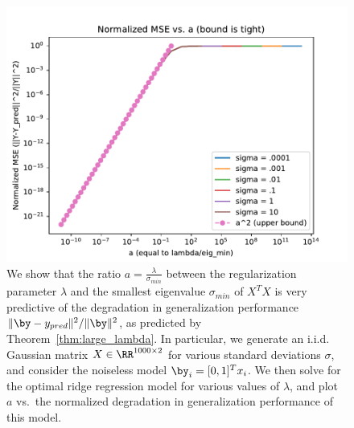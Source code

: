 \begin{figure}
	\begin{center}
		\centerline{\includegraphics[width=0.8\columnwidth]{figures/micro_large_sigma_min.pdf}}
		\caption{We show that the ratio $a=\frac{\lambda}{\sigma_{min}}$ between the regularization parameter $\lambda$ and the smallest eigenvalue $\sigma_{min}$ of $X^T X$ is very predictive of the degradation in generalization performance $\|\by - y_{pred}\|^2/\|\by\|^2$, as predicted by Theorem~\ref{thm:large_lambda}.
		In particular, we generate an i.i.d. Gaussian matrix $X\in \RR^{1000\times 2}$ for various standard deviations $\sigma$, and consider the noiseless model $\by_i = [0,1]^T x_i$.
		We then solve for the optimal ridge regression model for various values of $\lambda$, and plot $a$ vs.\ the normalized degradation in generalization performance of this model. 
		}
		\label{fig:micro_large_sigma_min}
	\end{center}
\end{figure}

